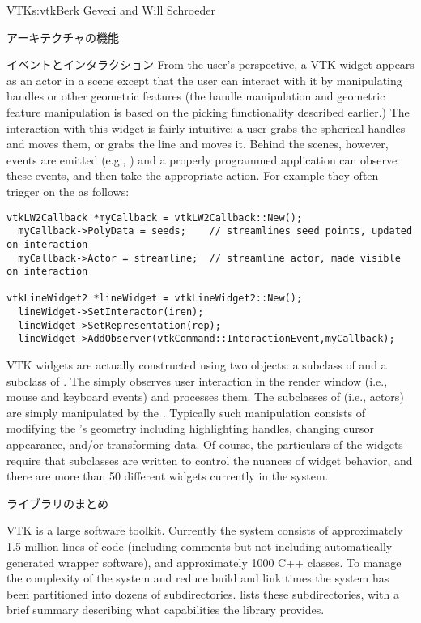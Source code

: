 \begin{aosachapter}{VTK}{s:vtk}{Berk Geveci and Will Schroeder}
\begin{aosasect1}{アーキテクチャの機能}
\begin{aosasect2}{イベントとインタラクション}
From the user's perspective, a VTK widget appears as an actor in a
scene except that the user can interact with it by manipulating
handles or other geometric features (the handle manipulation and
geometric feature manipulation is based on the picking functionality
described earlier.) The interaction with this widget is fairly
intuitive: a user grabs the spherical handles and moves them, or grabs
the line and moves it. Behind the scenes, however, events are emitted
(e.g., ) and a properly programmed application
can observe these events, and then take the appropriate action. For
example they often trigger on the 
as follows:

\begin{verbatim}
vtkLW2Callback *myCallback = vtkLW2Callback::New();
  myCallback->PolyData = seeds;    // streamlines seed points, updated on interaction
  myCallback->Actor = streamline;  // streamline actor, made visible on interaction

vtkLineWidget2 *lineWidget = vtkLineWidget2::New();
  lineWidget->SetInteractor(iren);
  lineWidget->SetRepresentation(rep);
  lineWidget->AddObserver(vtkCommand::InteractionEvent,myCallback);
\end{verbatim}

VTK widgets are actually constructed using two objects: a subclass of
 and a subclass of . The
 simply observes user interaction in the
render window (i.e., mouse and keyboard events) and processes
them. The subclasses of  (i.e., actors) are simply
manipulated by the . Typically such
manipulation consists of modifying the 's geometry
including highlighting handles, changing cursor appearance, and/or
transforming data. Of course, the particulars of the widgets require
that subclasses are written to control the nuances of widget behavior,
and there are more than 50 different widgets currently in the system.

\end{aosasect2}

\begin{aosasect2}{ライブラリのまとめ}

VTK is a large software toolkit. Currently the system consists of
approximately 1.5 million lines of code (including comments but not
including automatically generated wrapper software), and approximately
1000 C++ classes. To manage the complexity of the system and reduce
build and link times the system has been partitioned into dozens of
subdirectories.  lists these subdirectories,
with a brief summary describing what capabilities the library
provides.


\end{aosasect2}
\end{aosasect1}
\end{aosachapter}
